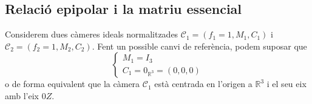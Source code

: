 \documentclass[a4paper,12pt]{article}
\begin{document}
	\subsection{Relació epipolar i la matriu essencial}
	Considerem dues càmeres ideals normalitzades $\mathcal{C}_1 = (f_1=1, M_1, C_1)$ i $\mathcal{C}_2 = (f_2=1, M_2, C_2)$. Fent un possible canvi de referència, podem suposar que
	\begin{displaymath}
		\begin{cases}
			M_1 = I_3\\
			C_1 = 0_{\mathbb{R}^3} = \left(0,0,0\right)
		\end{cases}
	\end{displaymath}
	o de forma equivalent que la càmera $\mathcal{C}_1$ està centrada en l'origen a $\mathbb{R}^3$ i el seu eix amb l'eix $0Z$.\\
\end{document}
